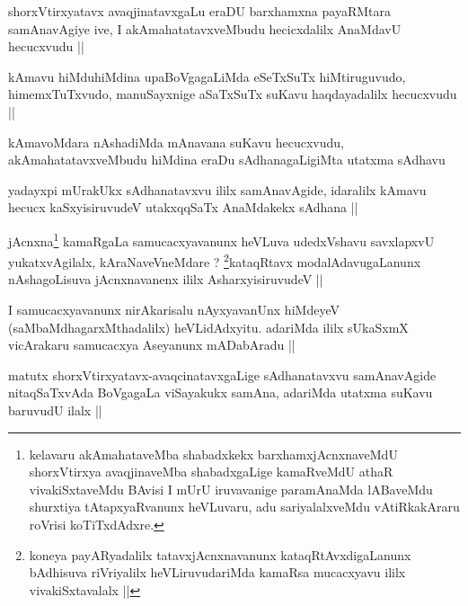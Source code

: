 \begin{artha}
shorxVtirxyatavx avaqjinatavxgaLu eraDU barxhamxna payaRMtara
samAnavAgiye ive, I akAmahatatavxveMbudu hecicxdalilx AnaMdavU
hecucxvudu ||
\end{artha}

\begin{artha}
kAmavu hiMduhiMdina upaBoVgagaLiMda eSeTxSuTx hiMtiruguvudo,
himemxTuTxvudo, manuSayxnige aSaTxSuTx suKavu haqdayadalilx
hecucxvudu ||
\end{artha}

\begin{artha}
kAmavoMdara nAshadiMda mAnavana suKavu hecucxvudu,
akAmahatatavxveMbudu hiMdina eraDu sAdhanagaLigiMta utatxma sAdhavu 
\end{artha}


\begin{artha}
yadayxpi mUrakUkx sAdhanatavxvu ililx samAnavAgide, idaralilx kAmavu
hecucx kaSxyisiruvudeV utakxqqSaTx AnaMdakekx sAdhana ||
\end{artha}

\begin{artha}
jAcnxna\footnote[1]{kelavaru akAmahataveMba shabadxkekx
  barxhamxjAcnxnaveMdU shorxVtirxya avaqjinaveMba shabadxgaLige
  kamaRveMdU athaR vivakiSxtaveMdu BAvisi I mUrU iruvavanige
  paramAnaMda lABaveMdu shurxtiya tAtapxyaRvanunx heVLuvaru, adu
  sariyalalxveMdu vAtiRkakAraru roVrisi koTiTxdAdxre.} kamaRgaLa samucacxyavanunx heVLuva udedxVshavu savxlapxvU
yukatxvAgilalx, kAraNaveVneMdare ? \footnote[2]{koneya payARyadalilx
  tatavxjAcnxnavanunx kataqRtAvxdigaLanunx bAdhisuva riVriyalilx
  heVLiruvudariMda kamaRsa mucacxyavu ililx vivakiSxtavalalx ||}kataqRtavx
modalAdavugaLanunx nAshagoLisuva jAcnxnavanenx ililx AsharxyisiruvudeV ||
\end{artha}

\begin{artha}
I samucacxyavanunx nirAkarisalu nAyxyavanUnx hiMdeyeV
(saMbaMdhagarxMthadalilx) heVLidAdxyitu. adariMda ililx sUkaSxmX
vicArakaru samucacxya Aseyanunx mADabAradu ||
\end{artha}

\begin{artha}
matutx shorxVtirxyatavx-avaqcinatavxgaLige sAdhanatavxvu samAnavAgide
nitaqSaTxvAda BoVgagaLa viSayakukx samAna, adariMda utatxma suKavu
baruvudU ilalx ||
\end{artha}

